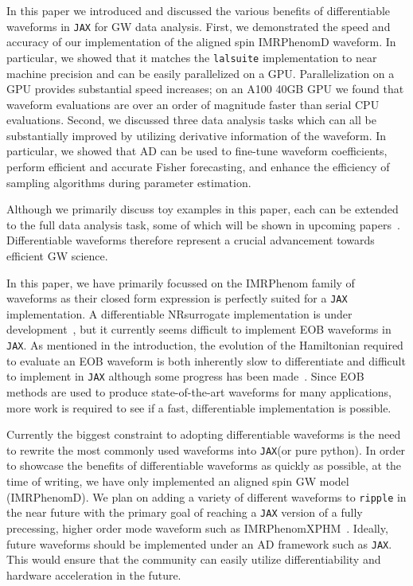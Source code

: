 \documentclass[twocolumn]{aastex631}
\newcommand{\jax}{\texttt{JAX}\xspace}
\newcommand{\ripple}{\texttt{ripple}\xspace}
\newcommand{\lalsuite}{\texttt{lalsuite}\xspace}
\begin{document}
In this paper we introduced and discussed the various benefits of differentiable waveforms in \jax for GW data analysis.
First, we demonstrated the speed and accuracy of our implementation of the aligned spin IMRPhenomD waveform.
In particular, we showed that it matches the \lalsuite implementation to near machine precision and can be easily parallelized on a GPU.
Parallelization on a GPU provides substantial speed increases; on an A100 40GB GPU we found that waveform evaluations are over an order of magnitude faster than serial CPU evaluations.
Second, we discussed three data analysis tasks which can all be substantially improved by utilizing derivative information of the waveform.
In particular, we showed that AD can be used to fine-tune waveform coefficients, perform efficient and accurate Fisher forecasting, and enhance the efficiency of sampling algorithms during parameter estimation.

Although we primarily discuss toy examples in this paper, each can be extended to the full data analysis task, some of which will be shown in upcoming papers~\citep{PEpaper}.
Differentiable waveforms therefore represent a crucial advancement towards efficient GW science.

In this paper, we have primarily focussed on the IMRPhenom family of waveforms as their closed form expression is perfectly suited for a \jax implementation.
A differentiable NRsurrogate implementation is under development~\citep{NRSurAD}, but it currently seems difficult to implement EOB waveforms in \jax.
As mentioned in the introduction, the evolution of the Hamiltonian required to evaluate an EOB waveform is both inherently slow to differentiate and difficult to implement in \jax although some progress has been made~\citep{diffrax}.
Since EOB methods are used to produce state-of-the-art waveforms for many applications, more work is required to see if a fast, differentiable implementation is possible.

Currently the biggest constraint to adopting differentiable waveforms is the need to rewrite the most commonly used waveforms into \jax (or pure python).
In order to showcase the benefits of differentiable waveforms as quickly as possible, at the time of writing, we have only implemented an aligned spin GW model (IMRPhenomD).
We plan on adding a variety of different waveforms to \ripple in the near future with the primary goal of reaching a \jax version of a fully precessing, higher order mode waveform such as IMRPhenomXPHM~\citep{Pratten:2020ceb}.
Ideally, future waveforms should be implemented under an AD framework such as \jax.
This would ensure that the community can easily utilize differentiability and hardware acceleration in the future.
\end{document}
